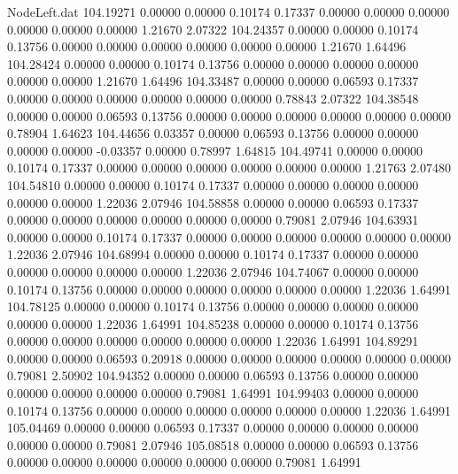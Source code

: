 \begin{filecontents}{NodeLeft.dat}
 104.19271    0.00000    0.00000     0.10174    0.17337    0.00000    0.00000    0.00000    0.00000    0.00000    0.00000    1.21670    2.07322
 104.24357    0.00000    0.00000     0.10174    0.13756    0.00000    0.00000    0.00000    0.00000    0.00000    0.00000    1.21670    1.64496
 104.28424    0.00000    0.00000     0.10174    0.13756    0.00000    0.00000    0.00000    0.00000    0.00000    0.00000    1.21670    1.64496
 104.33487    0.00000    0.00000     0.06593    0.17337    0.00000    0.00000    0.00000    0.00000    0.00000    0.00000    0.78843    2.07322
 104.38548    0.00000    0.00000     0.06593    0.13756    0.00000    0.00000    0.00000    0.00000    0.00000    0.00000    0.78904    1.64623
 104.44656    0.03357    0.00000     0.06593    0.13756    0.00000    0.00000    0.00000    0.00000   -0.03357    0.00000    0.78997    1.64815
 104.49741    0.00000    0.00000     0.10174    0.17337    0.00000    0.00000    0.00000    0.00000    0.00000    0.00000    1.21763    2.07480
 104.54810    0.00000    0.00000     0.10174    0.17337    0.00000    0.00000    0.00000    0.00000    0.00000    0.00000    1.22036    2.07946
 104.58858    0.00000    0.00000     0.06593    0.17337    0.00000    0.00000    0.00000    0.00000    0.00000    0.00000    0.79081    2.07946
 104.63931    0.00000    0.00000     0.10174    0.17337    0.00000    0.00000    0.00000    0.00000    0.00000    0.00000    1.22036    2.07946
 104.68994    0.00000    0.00000     0.10174    0.17337    0.00000    0.00000    0.00000    0.00000    0.00000    0.00000    1.22036    2.07946
 104.74067    0.00000    0.00000     0.10174    0.13756    0.00000    0.00000    0.00000    0.00000    0.00000    0.00000    1.22036    1.64991
 104.78125    0.00000    0.00000     0.10174    0.13756    0.00000    0.00000    0.00000    0.00000    0.00000    0.00000    1.22036    1.64991
 104.85238    0.00000    0.00000     0.10174    0.13756    0.00000    0.00000    0.00000    0.00000    0.00000    0.00000    1.22036    1.64991
 104.89291    0.00000    0.00000     0.06593    0.20918    0.00000    0.00000    0.00000    0.00000    0.00000    0.00000    0.79081    2.50902
 104.94352    0.00000    0.00000     0.06593    0.13756    0.00000    0.00000    0.00000    0.00000    0.00000    0.00000    0.79081    1.64991
 104.99403    0.00000    0.00000     0.10174    0.13756    0.00000    0.00000    0.00000    0.00000    0.00000    0.00000    1.22036    1.64991
 105.04469    0.00000    0.00000     0.06593    0.17337    0.00000    0.00000    0.00000    0.00000    0.00000    0.00000    0.79081    2.07946
 105.08518    0.00000    0.00000     0.06593    0.13756    0.00000    0.00000    0.00000    0.00000    0.00000    0.00000    0.79081    1.64991

\end{filecontents}

